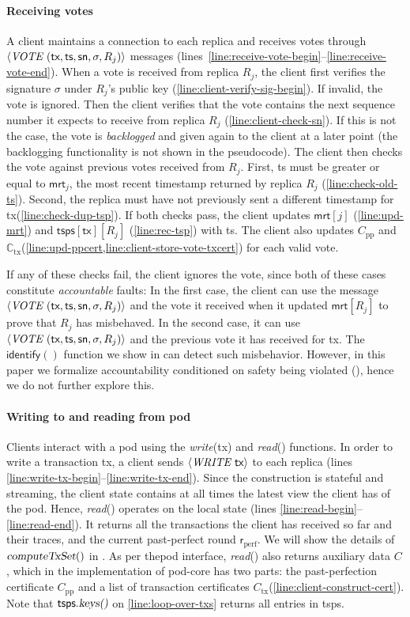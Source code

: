 \documentclass[pdflatex,sn-mathphys-num]{sn-jnl}%
\theoremstyle{thmstyleone}%
\theoremstyle{thmstyletwo}%
\theoremstyle{thmstylethree}%
\newcommand{\podtm}{\textsf{pod}\xspace}
\newcommand{\op}[1]{\textsl{#1}}
\newcommand{\opwrite}[1]{\op{write}(#1)\xspace}
\newcommand{\opreadall}[1]{\op{read}(#1)\xspace}
\newcommand{\opKeys}{\op{keys()}\xspace}
\newcommand{\operand}[1]{\textsf{#1}}
\newcommand{\tx}{\operand{tx}\xspace}
\newcommand{\round}{\operand{r}\xspace}
\newcommand{\heartBeat}{\textsc{heartBeat}\xspace}
\newcommand{\rperf}{\ensuremath{\round_\text{perf}}\xspace}
\newcommand{\rep}{\ensuremath{R}\xspace}
\newcommand{\mrt}{\operand{mrt}\xspace}
\newcommand{\tsps}{\operand{tsps}\xspace}
\newcommand{\tsp}{\operand{ts}\xspace}
\newcommand{\identify}[1]{\ensuremath{\mathsf{identify}(#1)}\xspace}
\newcommand{\txcert}{\ensuremath{C_\text{tx}}\xspace}
\newcommand{\alltxcert}{\ensuremath{\mathbb{C}_\text{tx}}\xspace}
\newcommand{\ppcert}{\ensuremath{C_\text{pp}}\xspace}
\newcommand{\cert}{\ensuremath{C}\xspace}
\newcommand{\dotparagraph}[1]{\paragraph*{#1}}
\newcommand{\msg}[2]{\ensuremath{\langle\textit{\uppercase{#1 }}#2\rangle}\xspace}
\newcommand{\msgwrite}[1]{\msg{write}{ #1}}
\newcommand{\msgrecord}[1]{\msg{vote}{ #1}}
\newcommand{\sig}{\ensuremath{\sigma}\xspace}
\newcommand{\sn}{\operand{sn}\xspace}
\newcommand{\opComputeTxSet}[1]{\op{computeTxSet}(#1)\xspace}
\begin{document}
\dotparagraph{Receiving votes}
A client maintains a connection to each replica and receives votes through \msgrecord{(\tx, \tsp, \sn, \sig, \rep_j)} messages (lines~\ref{line:receive-vote-begin}--\ref{line:receive-vote-end}).
When a vote is received from replica $\rep_j$, the client first verifies the signature \sig under $\rep_j$'s public key (\cref{line:client-verify-sig-begin}). If invalid, the vote is ignored.
Then the client verifies that the vote contains the next sequence number it expects to receive from replica $\rep_j$ (\cref{line:client-check-sn}). If this is not the case, the vote is \emph{backlogged} and given again to the client at a later point (the backlogging functionality is not shown in the pseudocode).
The client then checks the vote against previous votes received from $\rep_j$.
First, \tsp must be greater or equal to $\mrt_j$, the most recent timestamp returned by replica $\rep_j$ (\cref{line:check-old-ts}).
Second, the replica must have not previously sent a different timestamp for \tx (\cref{line:check-dup-tsp}).
If both checks pass, the client updates $\mrt[j]$ (\cref{line:upd-mrt}) and $\tsps[\tx][\rep_j]$ (\cref{line:rec-tsp}) with \tsp.
The client also updates \ppcert and \alltxcert (\cref{line:upd-ppcert,line:client-store-vote-txcert}) for each valid vote.

If any of these checks fail, the client ignores the vote, since both of these cases constitute \emph{accountable} faults: In the first case, the client can use the message $\msgrecord{(\tx, \tsp, \sn, \sig, \rep_j)}$ and the vote it received when it updated $\mrt[\rep_j]$ to prove that $\rep_j$ has misbehaved. In the second case, it can use $\msgrecord{(\tx, \tsp, \sn, \sig, \rep_j)}$ and the previous vote it has received for \tx.
The \identify{} function we show in  can detect such misbehavior. However, in this paper we formalize accountability conditioned on safety being violated (), hence we do not further explore this.

\dotparagraph{Writing to and reading from \podtm}
Clients interact with a \podtm using the \opwrite{\tx} and \opreadall{} functions.
In order to write a transaction \tx, a client sends \msgwrite{\tx} to each replica (lines \ref{line:write-tx-begin}--\ref{line:write-tx-end}).
Since the construction is stateful and streaming, the client state contains at all times the latest view the client has of the \podtm. Hence, \opreadall{} operates on the local state (lines \ref{line:read-begin}--\ref{line:read-end}).
It returns all the transactions the client has received so far and their traces, and the current past-perfect round \rperf.
We will show the details of $\opComputeTxSet{}$ in .
As per the\podtm interface, \opreadall{} also returns auxiliary data \cert, which in the implementation of \podtm-core has two parts: the past-perfection certificate \ppcert and a list of transaction certificates \txcert (\cref{line:client-construct-cert}).
Note that $\tsps.\opKeys{}$ on \cref{line:loop-over-txs} returns all entries in \tsps.
\end{document}
